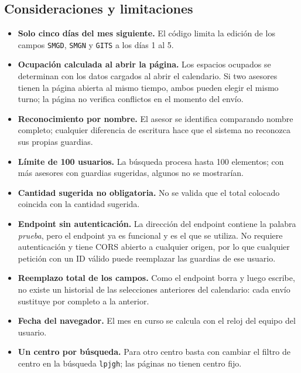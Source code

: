 \documentclass[11pt,a4paper]{article}
\newcommand{\code}[1]{\texttt{#1}}
\begin{document}
\subsection{Consideraciones y limitaciones}
\begin{itemize}
  \item \textbf{Solo cinco días del mes siguiente.} El código limita la edición de los campos \code{SMGD}, \code{SMGN} y \code{GITS} a los días 1 al 5.
  \item \textbf{Ocupación calculada al abrir la página.} Los espacios ocupados se determinan con los datos cargados al abrir el calendario. Si two asesores tienen la página abierta al mismo tiempo, ambos pueden elegir el mismo turno; la página no verifica conflictos en el momento del envío.
  \item \textbf{Reconocimiento por nombre.} El asesor se identifica comparando nombre completo; cualquier diferencia de escritura hace que el sistema no reconozca sus propias guardias.
  \item \textbf{Límite de 100 usuarios.} La búsqueda procesa hasta 100 elementos; con más asesores con guardias sugeridas, algunos no se mostrarían.
  \item \textbf{Cantidad sugerida no obligatoria.} No se valida que el total colocado coincida con la cantidad sugerida.
  \item \textbf{Endpoint sin autenticación.} La dirección del endpoint contiene la palabra \emph{prueba}, pero el endpoint ya es funcional y es el que se utiliza. No requiere autenticación y tiene CORS abierto a cualquier origen, por lo que cualquier petición con un ID válido puede reemplazar las guardias de ese usuario.
  \item \textbf{Reemplazo total de los campos.} Como el endpoint borra y luego escribe, no existe un historial de las selecciones anteriores del calendario: cada envío sustituye por completo a la anterior.
  \item \textbf{Fecha del navegador.} El mes en curso se calcula con el reloj del equipo del usuario.
  \item \textbf{Un centro por búsqueda.} Para otro centro basta con cambiar el filtro de centro en la búsqueda \code{lpjgh}; las páginas no tienen centro fijo.
\end{itemize}
\end{document}
